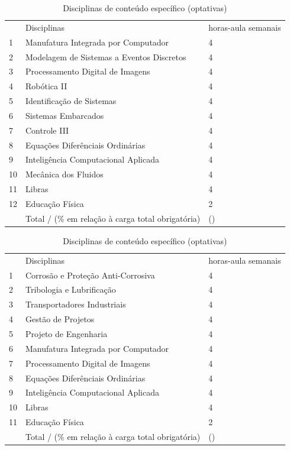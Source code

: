 \begin{longtable}{|p{0.8cm}|p{7.5cm}|p{2.0cm}|}
	\caption{Disciplinas de conteúdo específico (optativas)}\label{tab7} 
	\vspace{-0.25cm}
	\\ \hline 
	\cellcolor{\cinza} & \cellcolor{\cinza}Disciplinas & \cellcolor{\cinza}horas-aula semanais  \\ 
	\hline
	1 &  Manufatura Integrada por Computador  &  4 \\ \hline
	2 &  Modelagem de Sistemas a Eventos Discretos  &  4 \\ \hline
	3 &  Processamento Digital de Imagens  &  4 \\ \hline
	4 &  Robótica II  &  4 \\ \hline
	5 &  Identificação de Sistemas  &  4 \\ \hline
	6 &  Sistemas Embarcados  &  4 \\ \hline
	7 &  Controle III  &  4 \\ \hline
	8 &  Equações Diferênciais Ordinárias  &  4 \\ \hline
	9 &  Inteligência Computacional Aplicada  &  4 \\ \hline
	10 &  Mecânica dos Fluidos  &  4 \\ \hline
	11 &  Libras  &  4 \\ \hline
	12 &  Educação Física  &  2 \\ \hline
	&  Total / (\% em relação à carga total obrigatória)  &  \CHOPTCR(\CHOPTPEMIN) \\ \hline
\end{longtable}

\begin{longtable}{|p{0.8cm}|p{7.5cm}|p{2.0cm}|}
	\caption{Disciplinas de conteúdo específico (optativas)}\label{tab7} 
	\vspace{-0.25cm}
	\\ \hline 
	\cellcolor{\cinza} & \cellcolor{\cinza}Disciplinas & \cellcolor{\cinza}horas-aula semanais  \\ 
	\hline
	1 &  Corrosão e Proteção Anti-Corrosiva  &  4 \\ \hline
	2 &  Tribologia e Lubrificação  &  4 \\ \hline
	3 &  Transportadores Industriais  &  4 \\ \hline
	4 &  Gestão de Projetos  &  4 \\ \hline
	5 &  Projeto de Engenharia  &  4 \\ \hline
	6 &  Manufatura Integrada por Computador  &  4 \\ \hline
	7 &  Processamento Digital de Imagens  &  4 \\ \hline
	8 &  Equações Diferênciais Ordinárias  &  4 \\ \hline
	9 &  Inteligência Computacional Aplicada  &  4 \\ \hline
	10 &  Libras  &  4 \\ \hline
	11 &  Educação Física  &  2 \\ \hline
	&  Total / (\% em relação à carga total obrigatória)  &  \CHOPTCR(\CHOPTPEMIN) \\ \hline
\end{longtable}


